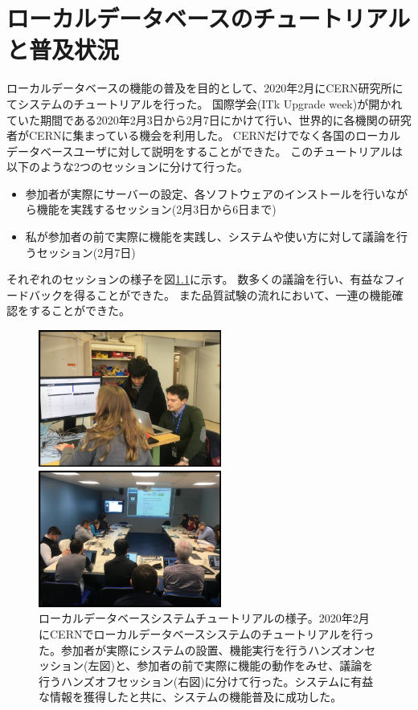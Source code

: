 \chapter{ローカルデータベースのチュートリアルと普及状況} \label{cap:appA}

ローカルデータベースの機能の普及を目的として、2020年2月にCERN研究所にてシステムのチュートリアルを行った。
国際学会(ITk Upgrade week)が開かれていた期間である2020年2月3日から2月7日にかけて行い、世界的に各機関の研究者がCERNに集まっている機会を利用した。
CERNだけでなく各国のローカルデータベースユーザに対して説明をすることができた。
このチュートリアルは以下のような2つのセッションに分けて行った。

\begin{itemize}
  \item 参加者が実際にサーバーの設定、各ソフトウェアのインストールを行いながら機能を実践するセッション(2月3日から6日まで)
  \item 私が参加者の前で実際に機能を実践し、システムや使い方に対して議論を行うセッション(2月7日)
\end{itemize}

それぞれのセッションの様子を図\ref{Tutorial_picture}に示す。
数多くの議論を行い、有益なフィードバックを得ることができた。
また品質試験の流れにおいて、一連の機能確認をすることができた。

\begin{figure}[bpt]
  \begin{center}
  \begin{minipage}{0.4\hsize}
    \includegraphics[width=6cm]{./hands_on.png}
  \end{minipage}
  \begin{minipage}{0.4\hsize}
    \includegraphics[width=6cm]{./hands_off.png}
  \end{minipage}
  \caption[ローカルデータベースシステムチュートリアルの様子]{ローカルデータベースシステムチュートリアルの様子。2020年2月にCERNでローカルデータベースシステムのチュートリアルを行った。参加者が実際にシステムの設置、機能実行を行うハンズオンセッション(左図)と、参加者の前で実際に機能の動作をみせ、議論を行うハンズオフセッション(右図)に分けて行った。システムに有益な情報を獲得したと共に、システムの機能普及に成功した。}
  \label{Tutorial_picture}
  \end{center}
\end{figure}

